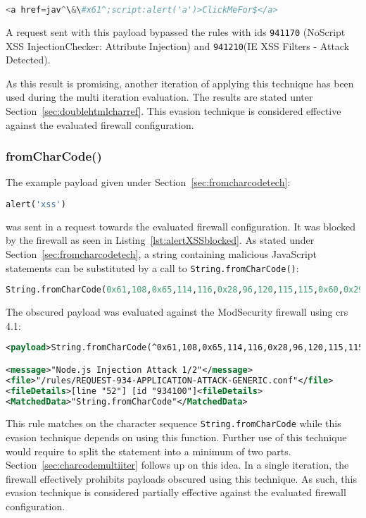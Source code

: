 \begin{lstlisting}[style=basicStyle, language=Python, escapeinside=\^\^]
<a href=jav^\&\#x61^;script:alert('a')>ClickMeFor$</a>
\end{lstlisting}
A request sent with this payload bypassed the rules with ids \verb|941170| (NoScript XSS InjectionChecker: Attribute Injection) and \verb|941210|(IE XSS Filters - Attack Detected).

As this result is promising, another iteration of applying this technique has been used during the multi iteration evaluation. The results are stated unter Section~\ref{sec:doublehtmlcharref}. This evasion technique is considered effective against the evaluated firewall configuration.

\subsubsection{fromCharCode()}
\label{sec:charcodesingleiter}
The example payload given under Section~\ref{sec:fromcharcodetech}:

\begin{lstlisting}[style=basicStyle, language=Python]
alert('xss')
\end{lstlisting}
was sent in a request towards the evaluated firewall configuration. It was blocked by the firewall as seen in Listing~\ref{lst:alertXSSblocked}. 
As stated under Section~\ref{sec:fromcharcodetech}, a string containing malicious JavaScript statements can be substituted by a call to \verb|String.fromCharCode()|:

\begin{lstlisting}[style=basicStyle, language=Python, escapeinside=\^\^]
String.fromCharCode(0x61,108,0x65,114,116,0x28,96,120,115,115,0x60,0x29)
\end{lstlisting}
The obscured payload was evaluated against the ModSecurity firewall using \acrshort{crs} 4.1:

\begin{lstlisting}[style=ruleStyle, language=XML, caption=fromCharCode() blocked, label={lst:fromcharcodeblocked}]
<payload>String.fromCharCode(^0x61,108,0x65,114,116,0x28,96,120,115,115,0x60,0x29^)</payload>

<message>"Node.js Injection Attack 1/2"</message>
<file>"/rules/REQUEST-934-APPLICATION-ATTACK-GENERIC.conf"</file>
<fileDetails>[line "52"] [id "934100"]<fileDetails>
<MatchedData>"String.fromCharCode"</MatchedData>
\end{lstlisting}
This rule matches on the character sequence \verb|String.fromCharCode| while this evasion technique depends on using this function. Further use of this technique would require to split the statement into a minimum of two parts. Section~\ref{sec:charcodemultiiter} follows up on this idea. In a single iteration, the firewall effectively prohibits payloads obscured using this technique. As such, this evasion technique is considered partially effective against the evaluated firewall configuration.

